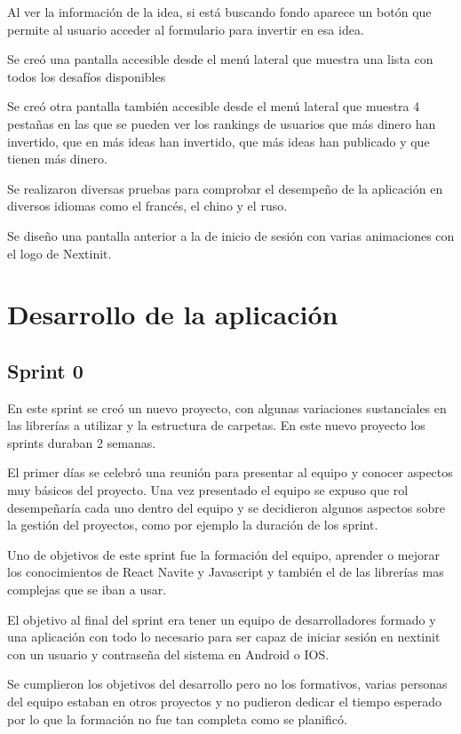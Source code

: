 Al ver la información de la idea, si está buscando fondo aparece un botón que permite al usuario 
acceder al formulario para invertir en esa idea.

Se creó una pantalla accesible desde el menú lateral que muestra una lista con todos los desafíos 
disponibles

Se creó otra pantalla también accesible desde el menú lateral que muestra 4 pestañas en las que se 
pueden ver los rankings de usuarios que más dinero han invertido, que en más ideas han invertido, 
que más ideas han publicado y que tienen más dinero.

Se realizaron diversas pruebas para comprobar el desempeño de la aplicación en diversos idiomas como 
el francés, el chino y el ruso.

Se diseño una pantalla anterior a la de inicio de sesión con varias animaciones con el logo de Nextinit.

\section{Desarrollo de la aplicación}

\subsection{Sprint 0}

En este sprint se creó un nuevo proyecto, con algunas variaciones sustanciales en las librerías a 
utilizar y la estructura de carpetas. En este nuevo proyecto los sprints duraban 2 semanas. 

El primer 
días se celebró una reunión para presentar al equipo y conocer aspectos muy básicos del proyecto. Una 
vez presentado el equipo se expuso que rol desempeñaría cada uno dentro del equipo y se decidieron 
algunos aspectos sobre la gestión del proyectos, como por ejemplo la duración de los sprint.

Uno de objetivos de este sprint fue la formación del equipo, aprender o mejorar los conocimientos de 
React Navite y Javascript y también el de las librerías mas complejas que se iban a usar.

El objetivo al final del sprint era tener un equipo de desarrolladores formado y una aplicación 
con todo lo necesario para ser 
capaz de iniciar sesión en nextinit con un usuario y contraseña del sistema en Android o IOS.

Se cumplieron los objetivos del desarrollo pero no los formativos, varias personas del equipo estaban 
en otros proyectos y no pudieron dedicar el tiempo esperado por lo que la formación no fue tan completa 
como se planificó.

